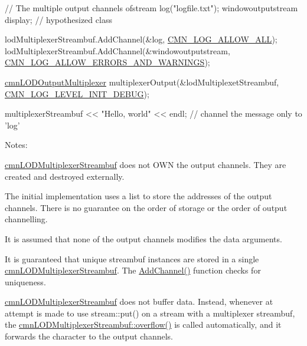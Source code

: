 \begin{DoxyCode}
 \textcolor{comment}{// The multiple output channels}
ofstream log(\textcolor{stringliteral}{"logfile.txt"});
windowoutputstream display;    \textcolor{comment}{// hypothesized class}

lodMultiplexerStreambuf.AddChannel(&log, \hyperlink{cmn_log_lo_d_8h_acf03c43c8a0fbe1c13b2aa4ac3b0a856}{CMN\_LOG\_ALLOW\_ALL});
lodMultiplexerStreambuf.AddChannel(&windowoutputstream, 
      \hyperlink{cmn_log_lo_d_8h_a4414b84b0d7c28e5df5728224b987125}{CMN\_LOG\_ALLOW\_ERRORS\_AND\_WARNINGS});

\hyperlink{classcmn_l_o_d_output_multiplexer}{cmnLODOutputMultiplexer} multiplexerOutput(&lodMultiplexetStreambuf, 
      \hyperlink{cmn_log_lo_d_8h_a27e55e3638c78366331ee3c1ca3d60ef}{CMN\_LOG\_LEVEL\_INIT\_DEBUG});

multiplexerStreambuf << \textcolor{stringliteral}{"Hello, world"} << endl;  \textcolor{comment}{// channel the message only to 'log'}
\end{DoxyCode}


Notes\+:
\begin{DoxyEnumerate}
\item \hyperlink{classcmn_l_o_d_multiplexer_streambuf}{cmn\+L\+O\+D\+Multiplexer\+Streambuf} does not O\+W\+N the output channels. They are created and destroyed externally.
\item The initial implementation uses a list to store the addresses of the output channels. There is no guarantee on the order of storage or the order of output channelling.
\item It is assumed that none of the output channels modifies the data arguments.
\item It is guaranteed that unique streambuf instances are stored in a single \hyperlink{classcmn_l_o_d_multiplexer_streambuf}{cmn\+L\+O\+D\+Multiplexer\+Streambuf}. The \hyperlink{classcmn_l_o_d_multiplexer_streambuf_a13062543394fee2e08419f0ecad3b5c1}{Add\+Channel()} function checks for uniqueness.
\item \hyperlink{classcmn_l_o_d_multiplexer_streambuf}{cmn\+L\+O\+D\+Multiplexer\+Streambuf} does not buffer data. Instead, whenever at attempt is made to use stream\+::put() on a stream with a multiplexer streambuf, the \hyperlink{classcmn_l_o_d_multiplexer_streambuf_a95173de27f7abc67614838d79858c5bf}{cmn\+L\+O\+D\+Multiplexer\+Streambuf\+::overflow()} is called automatically, and it forwards the character to the output channels.
\end{DoxyEnumerate}

